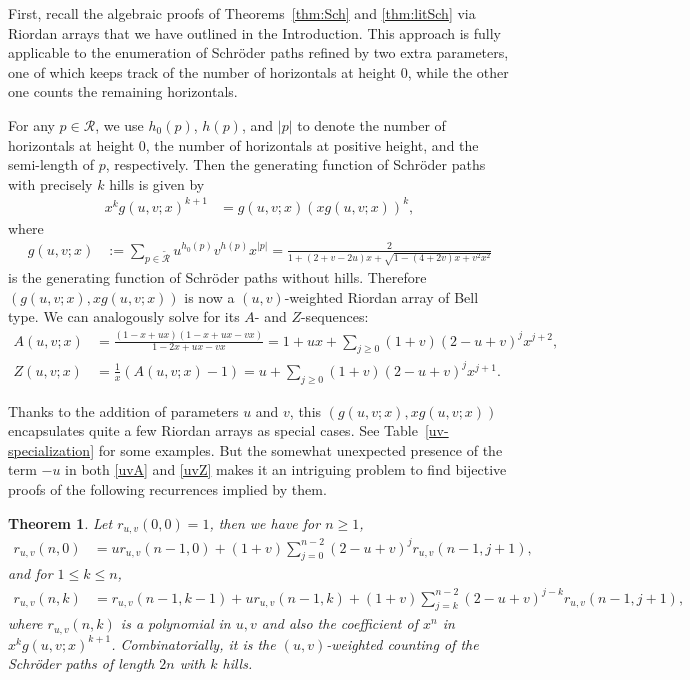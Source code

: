\documentclass[11pt,reqno]{amsart}
\numberwithin{equation}{section}
\theoremstyle{plain}
\newtheorem{theorem}{Theorem}[section]
\theoremstyle{definition}
\newcommand{\R}{\mathcal{R}}
\begin{document}
First, recall the algebraic proofs of Theorems~\ref{thm:Sch} and \ref{thm:litSch} via Riordan arrays that we have outlined in the Introduction. This approach is fully applicable to the enumeration of Schr\"oder paths refined by two extra parameters, one of which keeps track of the number of horizontals at height $0$, while the other one counts the remaining horizontals.

For any $p\in\R$, we use $h_0(p)$, $h(p)$, and $|p|$ to denote the number of horizontals at height $0$, the number of horizontals at positive height, and the semi-length of $p$, respectively. Then the generating function of Schr\"oder paths with precisely $k$ hills is given by
\begin{align*}
x^kg(u,v;x)^{k+1} &=g(u,v;x) (xg(u,v;x))^k,
\end{align*}
where
\begin{align*}
g(u,v;x) &:=\sum_{p\in\widetilde{\R}}u^{h_0(p)}v^{h(p)}x^{|p|}=\frac{2}{1+(2+v-2u)x+\sqrt{1-(4+2v)x+v^2x^2}}
\end{align*}
is the generating function of Schr\"oder paths without hills. Therefore $(g(u,v;x),xg(u,v;x))$ is now a $(u,v)$-weighted Riordan array of Bell type. We can analogously solve for its $A$- and $Z$-sequences:
\begin{align}
A(u,v;x) &= \frac{(1-x+ux)(1-x+ux-vx)}{1-2x+ux-vx}=1+ux+\sum_{j\ge 0}(1+v)(2-u+v)^jx^{j+2},\label{uvA}\\
Z(u,v;x) &= \frac{1}{x}(A(u,v;x)-1)=u+\sum_{j\ge 0}(1+v)(2-u+v)^jx^{j+1}.\label{uvZ}
\end{align}

Thanks to the addition of parameters $u$ and $v$, this $(g(u,v;x),xg(u,v;x))$ encapsulates quite a few Riordan arrays as special cases. See Table~\ref{uv-specialization} for some examples. But the somewhat unexpected presence of the term $-u$ in both \eqref{uvA} and \eqref{uvZ} makes it an intriguing problem to find bijective proofs of the following recurrences implied by them. 
\begin{theorem}
Let $r_{u,v}(0,0)=1$, then we have for $n\ge 1$,
\begin{align}
r_{u,v}(n,0)&=ur_{u,v}(n-1,0)+(1+v)\sum\limits_{j=0}^{n-2}(2-u+v)^{j}r_{u,v}(n-1,j+1),\label{uvZ-rec}
\end{align}
and for $1\le k\le n$,
\begin{align}
r_{u,v}(n,k)&=r_{u,v}(n-1,k-1)+ur_{u,v}(n-1,k)+(1+v)\sum\limits_{j=k}^{n-2}(2-u+v)^{j-k}r_{u,v}(n-1,j+1),\label{uvA-rec}
\end{align}
where $r_{u,v}(n,k)$ is a polynomial in $u,v$ and also the coefficient of $x^n$ in $x^kg(u,v;x)^{k+1}$. Combinatorially, it is the $(u,v)$-weighted counting of the Schr\"oder paths of length $2n$ with $k$ hills.
\end{theorem}
\end{document}
